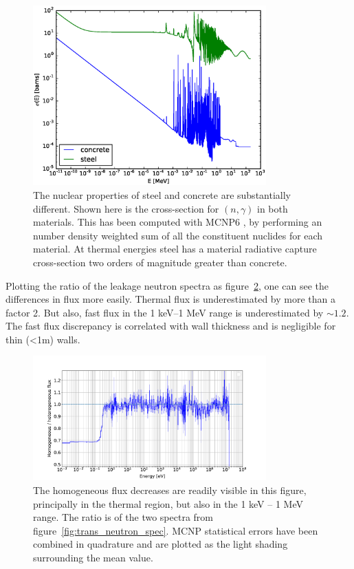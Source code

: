 \begin{figure}[H]
  \centering
  \includegraphics[width=0.8\textwidth]{n_rad_capture}
  \caption[Radiative capture cross-sections in concrete and steel.]{The nuclear properties of steel and concrete are substantially different. Shown here is the cross-section for $(n,\gamma)$ in both materials. This has been computed with MCNP6 \cite{Goorley2012}, by performing an number density weighted sum of all the constituent nuclides for each material. At thermal energies steel has a material radiative capture cross-section two orders of magnitude greater than concrete.}
  \label{fig:n_rad_capture}
\end{figure}

Plotting the ratio of the leakage neutron spectra as figure~\ref{fig:relative_neutron_spectra}, one can see the differences in flux more easily. Thermal flux is underestimated by more than a factor 2. But also, fast flux in the 1 keV--1 MeV range is underestimated by $\sim1.2$. The fast flux discrepancy is correlated with wall thickness and is negligible for thin (\textless 1m) walls.

\begin{figure}[H]
  \centering
  \includegraphics[width=0.8\textwidth]{25HB200_800_relative_n_spectra}
  \caption[Ratio of transmitted spectra.]{The homogeneous flux decreases are readily visible in this figure, principally in the thermal region, but also in the 1 keV -- 1 MeV range. The ratio is of the two spectra from figure~\ref{fig:trans_neutron_spec}. MCNP statistical errors have been combined in quadrature and are plotted as the light shading surrounding the mean value.}
  \label{fig:relative_neutron_spectra}
\end{figure}

